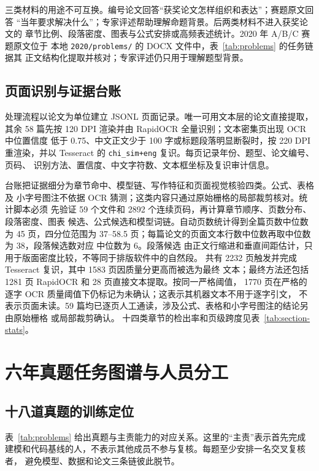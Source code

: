 \documentclass[UTF8,a4paper,12pt]{ctexart}
\begin{document}
三类材料的用途不可互换。编号论文回答“获奖论文怎样组织和表达”；赛题原文回答
“当年要求解决什么”；专家评述帮助理解命题背景。后两类材料不进入获奖论文的
章节比例、段落密度、图表与公式安排或高频表述统计。2020 年 A/B/C 赛题原文位于
本地 \texttt{2020/problems/} 的 DOCX 文件中，表~\ref{tab:problems} 的任务链据其
正文结构化提取并核对；专家评述仍只用于理解题型背景。

\subsection{页面识别与证据台账}

处理流程以论文为单位建立 JSONL 页面记录。唯一可用文本层的论文直接提取，其余
58 篇先按 120 DPI 渲染并由 RapidOCR 全量识别；文本密集页出现 OCR 中位置信度
低于 0.75、中文正文少于 100 字或标题段落明显断裂时，按 220 DPI 重渲染，并以
Tesseract 的 \texttt{chi\_sim+eng} 复识。每页记录年份、题型、论文编号、页码、
识别方法、置信度、中文字符数、文本框坐标及复识审计信息。

台账把证据细分为章节命中、模型链、写作特征和页面视觉核验四类。公式、表格及
小字号图注不依据 OCR 猜测；这类内容只通过原始栅格的局部裁剪核对。统计脚本必须
先验证 59 个文件和 2892 个连续页码，再计算章节顺序、页数分布、段落密度、图表
候选、公式候选和模型词链。自动页数统计得到全篇页数中位数为 45 页，四分位范围为
37--58.5 页；每篇论文的页面文本行数中位数再取中位数为 38，段落候选数对应
中位数为 6。段落候选
由正文行缩进和垂直间距估计，只用于版面密度比较，不等同于排版软件中的自然段。
共有 2232 页触发并完成 Tesseract 复识，其中 1583 页因质量分更高而被选为最终
文本；最终方法还包括 1281 页 RapidOCR 和 28 页直接文本提取。按同一严格阈值，
1770 页在严格的逐字 OCR 质量阈值下仍标记为未确认；这表示其机器文本不用于逐字引文，
不表示页面未读。59 篇均已逐页人工通读，涉及公式、表格和小字号图注的结论另由原始栅格
或局部裁剪确认。
十四类章节的检出率和页级跨度见表~\ref{tab:section-stats}。

\section{六年真题任务图谱与人员分工}

\subsection{十八道真题的训练定位}

表~\ref{tab:problems} 给出真题与主责能力的对应关系。这里的“主责”表示首先完成
建模和代码基线的人，不表示其他成员不参与复核。每题至少安排一名交叉复核者，
避免模型、数据和论文三条链彼此脱节。
\end{document}
